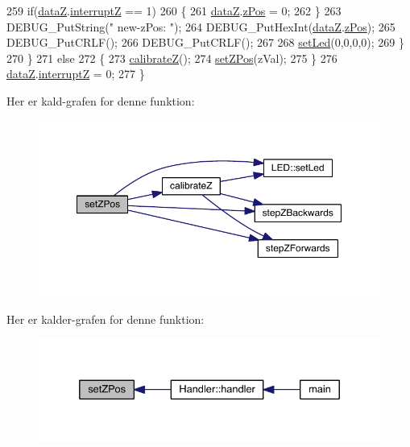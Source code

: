 \begin{DoxyCode}
259       \textcolor{keywordflow}{if}(\hyperlink{data_8h_ace1aa5b973b9358f7236c0c9deca9370}{dataZ}.\hyperlink{data_8h_ad31cb1c3240ac1f76fc3faa902b49c24}{interruptZ} == 1)
260       \{
261         \hyperlink{data_8h_ace1aa5b973b9358f7236c0c9deca9370}{dataZ}.\hyperlink{data_8h_aafb6592f063176df6830ef1f1e29ae72}{zPos} = 0;
262       \}
263       DEBUG\_PutString(\textcolor{stringliteral}{" new-zPos: "});
264       DEBUG\_PutHexInt(\hyperlink{data_8h_ace1aa5b973b9358f7236c0c9deca9370}{dataZ}.\hyperlink{data_8h_aafb6592f063176df6830ef1f1e29ae72}{zPos});
265       DEBUG\_PutCRLF();
266       DEBUG\_PutCRLF();
267       
268       \hyperlink{led_8h_a1d8e725e3829da99c1d027ba0a2ce57a}{setLed}(0,0,0,0);
269     \}
270   \}
271   \textcolor{keywordflow}{else}
272   \{
273     \hyperlink{class_z_a75e9200c2d48803f4bb723bd1fea24ea}{calibrateZ}();
274     \hyperlink{class_z_a32c07d919fae10a36ead3ac6766f7355}{setZPos}(zVal);
275   \}
276   \hyperlink{data_8h_ace1aa5b973b9358f7236c0c9deca9370}{dataZ}.\hyperlink{data_8h_ad31cb1c3240ac1f76fc3faa902b49c24}{interruptZ} = 0;
277 \}
\end{DoxyCode}


Her er kald-\/grafen for denne funktion\+:
\nopagebreak
\begin{figure}[H]
\begin{center}
\leavevmode
\includegraphics[width=350pt]{d7/d97/class_z_a32c07d919fae10a36ead3ac6766f7355_cgraph}
\end{center}
\end{figure}




Her er kalder-\/grafen for denne funktion\+:
\nopagebreak
\begin{figure}[H]
\begin{center}
\leavevmode
\includegraphics[width=332pt]{d7/d97/class_z_a32c07d919fae10a36ead3ac6766f7355_icgraph}
\end{center}
\end{figure}


